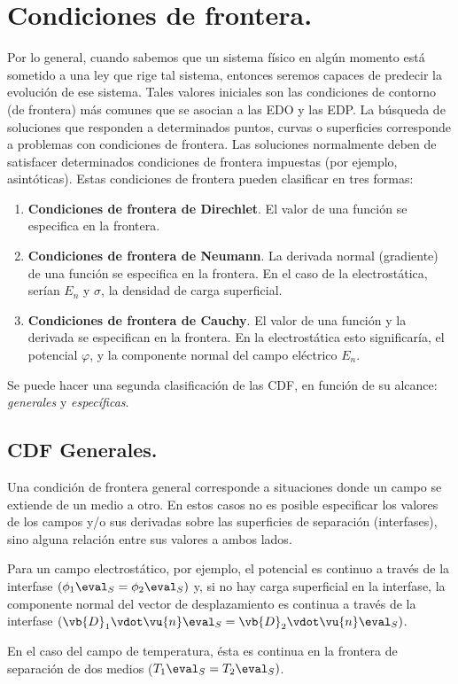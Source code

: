 \section{Condiciones de frontera.}
Por lo general, cuando sabemos que un sistema físico en algún momento está sometido a una ley que rige tal sistema, entonces seremos capaces de predecir la evolución de ese sistema. Tales valores iniciales son las condiciones de contorno (de frontera) más comunes que se asocian a las EDO y las EDP. La búsqueda de soluciones que responden a determinados puntos, curvas o superficies corresponde a problemas con condiciones de frontera. Las soluciones normalmente deben de satisfacer determinados condiciones de frontera impuestas (por ejemplo, asintóticas). Estas condiciones de frontera pueden clasificar en tres formas:
\begin{enumerate}
\item \textbf{Condiciones de frontera de Direchlet}. El valor de una función se especifica en la frontera.
\item \textbf{Condiciones de frontera de Neumann}. La derivada normal (gradiente) de una función se especifica en la frontera. En el caso de la electrostática, serían $E_{n}$ y $\sigma$, la densidad de carga superficial.
\item \textbf{Condiciones de frontera de Cauchy}. El valor de una función y la derivada se especifican en la frontera. En la electrostática esto significaría, el potencial $\varphi$, y la componente normal del campo eléctrico $E_{n}$.
\end{enumerate}
Se puede hacer una segunda clasificación de las CDF, en función de su alcance: \emph{generales} y \emph{específicas}.
\subsection*{CDF Generales.}
Una condición de frontera general corresponde a situaciones donde un campo se extiende de un medio a otro. En estos casos no es posible especificar los valores de los campos y/o sus derivadas sobre las superficies de separación (interfases), sino alguna relación entre sus valores a ambos lados.
\par
Para un campo electrostático, por ejemplo, el potencial es continuo a través de la interfase $(\phi_{1} \eval_{S} = \phi_{2} \eval_{S})$ y, si no hay carga superficial en la interfase, la componente normal del vector de desplazamiento es continua a través de la interfase $(\vb{D}_{1} \vdot \vu{n} \eval_{S} = \vb{D}_{2} \vdot \vu{n} \eval_{S})$.
\par
En el caso del campo de temperatura, ésta es continua en la frontera de separación de dos medios ($T_{1} \eval_{S} = T_{2} \eval_{S})$.
